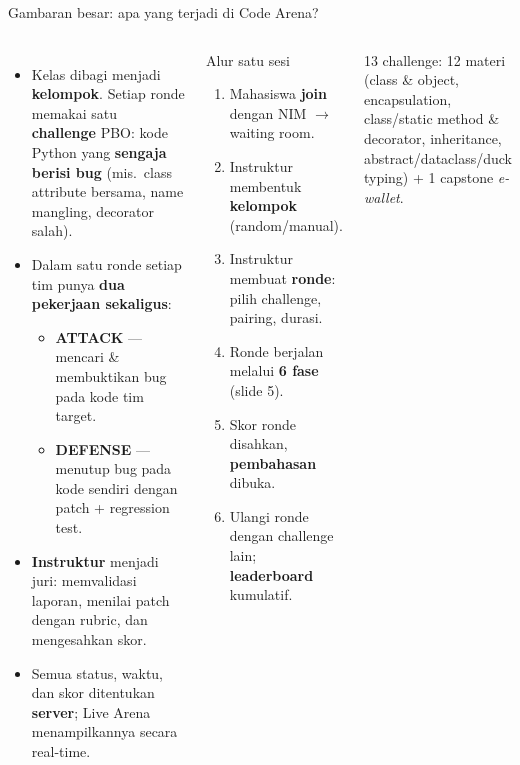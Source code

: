 \documentclass[aspectratio=169,10pt]{beamer}
\newcommand{\hl}[1]{\textcolor{cyanx}{\textbf{#1}}}
\newcommand{\warn}[1]{\textcolor{redx}{\textbf{#1}}}
\begin{document}
\begin{frame}{Gambaran besar: apa yang terjadi di Code Arena?}
\begin{columns}[T,onlytextwidth]
\begin{itemize}\setlength\itemsep{0.35em}
  \item Kelas dibagi menjadi \hl{kelompok}. Setiap ronde memakai satu \hl{challenge} PBO: kode Python yang \warn{sengaja berisi bug} (mis.\ class attribute bersama, name mangling, decorator salah).
  \item Dalam satu ronde setiap tim punya \textbf{dua pekerjaan sekaligus}:
  \begin{itemize}
    \item \textcolor{redx}{\textbf{ATTACK}} --- mencari \& membuktikan bug pada kode tim target.
    \item \textcolor{cyanx}{\textbf{DEFENSE}} --- menutup bug pada kode sendiri dengan patch + regression test.
  \end{itemize}
  \item \hl{Instruktur} menjadi juri: memvalidasi laporan, menilai patch dengan rubric, dan mengesahkan skor.
  \item Semua status, waktu, dan skor ditentukan \textbf{server}; Live Arena menampilkannya secara real-time.
\end{itemize}
\begin{block}{Alur satu sesi}
\begin{enumerate}\setlength\itemsep{0.15em}\small
  \item Mahasiswa \textbf{join} dengan NIM $\rightarrow$ waiting room.
  \item Instruktur membentuk \textbf{kelompok} (random/manual).
  \item Instruktur membuat \textbf{ronde}: pilih challenge, pairing, durasi.
  \item Ronde berjalan melalui \textbf{6 fase} (slide 5).
  \item Skor ronde disahkan, \textbf{pembahasan} dibuka.
  \item Ulangi ronde dengan challenge lain; \textbf{leaderboard} kumulatif.
\end{enumerate}
\end{block}
\vspace{0.3em}
{\footnotesize\color{greyx} 13 challenge: 12 materi (class \& object, encapsulation, class/static method \& decorator, inheritance, abstract/dataclass/duck typing) + 1 capstone \emph{e-wallet}.}
\end{columns}
\end{frame}
\end{document}
